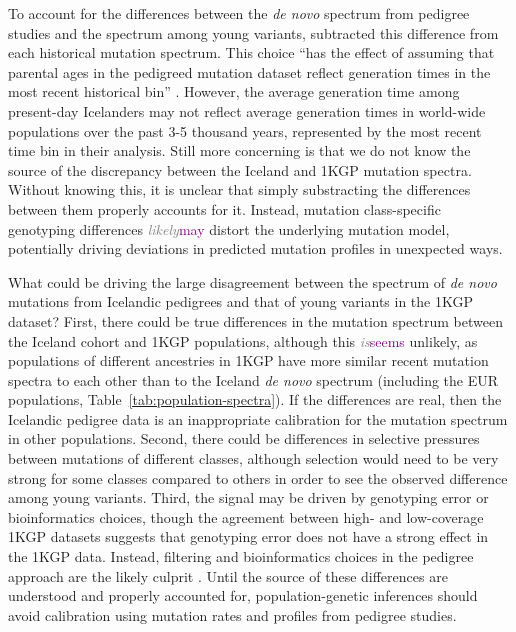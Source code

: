 \documentclass[]{article}
\newcommand{\krtedit}[2]{{\emph{\textcolor{gray}{#1}}}{\textcolor{purple}{#2}}}
\begin{document}
To account for the differences between the \emph{de novo} spectrum from
pedigree studies \citep{jonsson2017parental} and the spectrum among young
variants, \citet{wang2023human} subtracted this difference from each historical
mutation spectrum. This choice ``has the effect of assuming that parental ages
in the pedigreed mutation dataset reflect generation times in the most recent
historical bin'' \citep{wang2023human}. However, the average generation time
among present-day Icelanders may not reflect average generation times in
world-wide populations over the past 3-5 thousand years, represented by the
most recent time bin in their analysis. Still more concerning is that we do not
know the source of the discrepancy between the Iceland and 1KGP mutation
spectra. Without knowing this, it is unclear that simply substracting the
differences between them properly accounts for it. Instead, mutation
class-specific genotyping differences \krtedit{likely}{may} distort the underlying mutation
model, potentially driving deviations in predicted mutation profiles in
unexpected ways.

What could be driving the large disagreement between the spectrum of \emph{de
novo} mutations from Icelandic pedigrees and that of young variants in the 1KGP
dataset? First, there could be true differences in the mutation spectrum
between the Iceland cohort and 1KGP populations, although this \krtedit{is}{seems} unlikely, as
populations of different ancestries in 1KGP have more similar recent mutation
spectra to each other than to the Iceland \emph{de novo} spectrum (including
the EUR populations, Table~\ref{tab:population-spectra}). If the differences
are real, then the Icelandic pedigree data is an inappropriate calibration for
the mutation spectrum in other populations. Second, there could be differences
in selective pressures between mutations of different classes, although
selection would need to be very strong for some classes compared to others in
order to see the observed difference among young variants.  Third, the signal
may be driven by genotyping error or bioinformatics choices, though the
agreement between high- and low-coverage 1KGP datasets suggests that genotyping
error does not have a strong effect in the 1KGP data. Instead, filtering and
bioinformatics choices in the pedigree approach are the likely culprit
\citep{bergeron2022mutationathon}. Until the source of these differences are
understood and properly accounted for, population-genetic inferences should
avoid calibration using mutation rates and profiles from pedigree studies.
\end{document}

